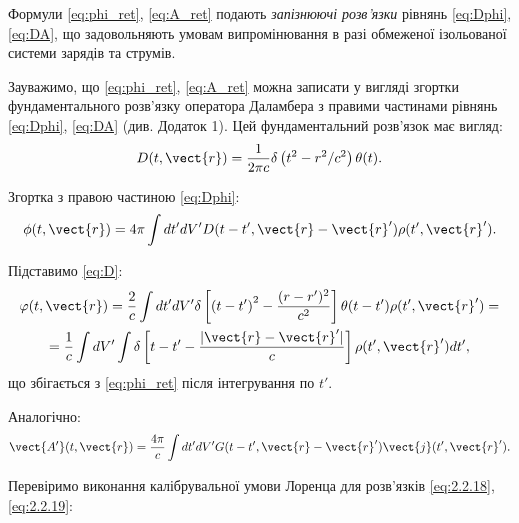 Формули \eqref{eq:phi_ret}, \eqref{eq:A_ret} подають \textit{запізнюючі розв’язки} рівнянь \eqref{eq:Dphi}, \eqref{eq:DA}, що задовольняють умовам
випромінювання в разі
обмеженої
ізольованої системи зарядів та струмів.

Зауважимо, що \eqref{eq:phi_ret}, \eqref{eq:A_ret} можна записати у вигляді згортки фундаментального розв’язку оператора Даламбера з правими частинами
рівнянь
\eqref{eq:Dphi},
\eqref{eq:DA} (див. Додаток 1). Цей фундаментальний розв’язок має вигляд:
\begin{equation}\label{eq:D}
	D(t, \vect{r}) = \frac{1}{2\pi c} \delta \left( t^2 - r^2 / c^2 \right) \theta(t).
\end{equation}

Згортка з правою частиною \eqref{eq:Dphi}:
\begin{equation}\label{eq:2.2.18}
	\phi (t, \vect{r}) = 4\pi \int dt' dV' D(t - t', \vect{r} - \vect{r}') \rho (t', \vect{r}').
\end{equation}

Підставимо \eqref{eq:D}:
\begin{multline*}
	\varphi (t, \vect{r}) = \frac{2}{c} \int dt' dV' \delta \left[ \left( t - t' \right)^2 - \frac{(r - r')^2}{c^2} \right] \theta (t - t') \rho (t',
	\vect{r}') = \\
	= \frac{1}{c} \int dV' \int \delta \left[ t - t' - \frac{|\vect{r} - \vect{r}'|}{c} \right] \rho (t', \vect{r}') dt',
\end{multline*}
що збігається з \eqref{eq:phi_ret} після інтегрування по $t'$.

Аналогічно:
\begin{equation}\label{eq:2.2.19}
	\vect{A'} (t, \vect{r}) = \frac{4\pi}{c} \int dt' dV' G(t - t', \vect{r} - \vect{r}') \vect{j} (t', \vect{r}').
\end{equation}

Перевіримо виконання калібрувальної умови Лоренца для розв’язків \eqref{eq:2.2.18}, \eqref{eq:2.2.19}:

